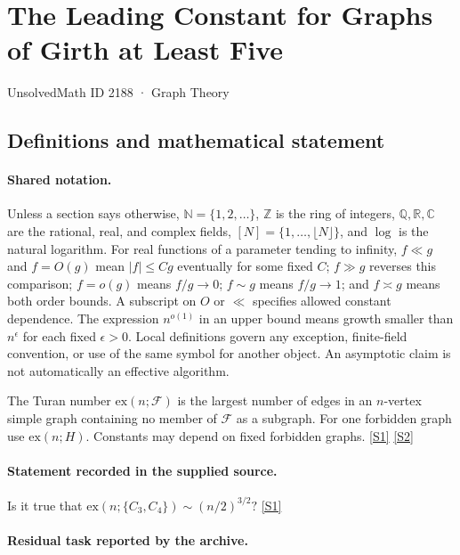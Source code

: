 \documentclass[11pt,a4paper]{article}
\newcommand{\N}{\mathbb{N}}
\newcommand{\Z}{\mathbb{Z}}
\newcommand{\Q}{\mathbb{Q}}
\newcommand{\R}{\mathbb{R}}
\newcommand{\C}{\mathbb{C}}
\newcommand{\sref}[2]{\hyperlink{source:#1:#2}{[S#2]}}
\begin{document}

\setcounter{section}{2187}

\section{The Leading Constant for Graphs of Girth at Least Five}\label{2188}

{\small\sffamily UnsolvedMath ID 2188 · Graph Theory}

\subsection{Definitions and mathematical statement}

\paragraph{Shared notation.}Unless a section says otherwise, $\N=\{1,2,\ldots\}$,
$\Z$ is the ring of integers, $\Q,\R,\C$ are the rational, real, and complex
fields, $[N]=\{1,\ldots,\lfloor N\rfloor\}$, and $\log$ is the natural
logarithm. For real functions of a parameter tending to infinity,
$f\ll g$ and $f=O(g)$ mean $|f|\leq Cg$ eventually for some fixed $C$;
$f\gg g$ reverses this comparison; $f=o(g)$ means $f/g\to0$;
$f\sim g$ means $f/g\to1$; and $f\asymp g$ means both order bounds.
A subscript on $O$ or $\ll$ specifies allowed constant dependence.
The expression $n^{o(1)}$ in an upper bound means growth smaller than
$n^\epsilon$ for each fixed $\epsilon>0$. Local definitions govern any
exception, finite-field convention, or use of the same symbol for another
object. An asymptotic claim is not automatically an effective algorithm.



The Turan number $\mathrm{ex}(n;\mathcal F)$ is the largest number of edges in an $n$-vertex simple graph containing no member of $\mathcal F$ as a subgraph. For one forbidden graph use $\mathrm{ex}(n;H)$. Constants may depend on fixed forbidden graphs. \sref{2188}{1} \sref{2188}{2}

\paragraph{Statement recorded in the supplied source.}
Is it true that $ \mathrm{ex}(n;\{C_3,C_4\})\sim (n/2)^{3/2}? $ \sref{2188}{1}

\paragraph{Residual task reported by the archive.}
\end{document}
